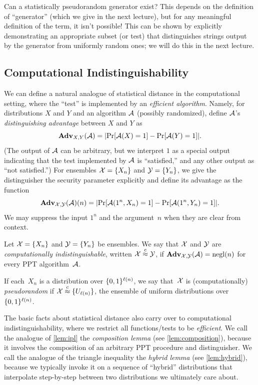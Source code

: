 \documentclass[11pt]{article}
\begin{document}
Can a statistically pseudorandom generator exist?  This
depends on the definition of ``generator'' (which we give in the next lecture), but
for any meaningful definition of the term, it isn't possible!  This
can be shown by explicitly demonstrating an appropriate subset (or
test) that distinguishes strings output by the generator from
uniformly random ones; we will do this in the next lecture.

\subsection{Computational Indistinguishability}
\label{sec:comp-indist}

We can define a natural analogue of statistical distance in the
computational setting, where the ``test'' is implemented by an
\emph{efficient algorithm}.  Namely, for distributions $X$ and $Y$ and
an algorithm $\mathcal{A}$ (possibly randomized), define $\mathcal{A}$'s
\emph{distinguishing advantage} between $X$ and $Y$ as
\[ \advan_{X,Y}(\Adv) = \abs*{\Pr[\Adv(X)=1] - \Pr[\Adv(Y)=1]}. \]
(The output of $\mathcal{A}$ can be arbitrary, but we interpret $1$ as a
special output indicating that the test implemented by $\mathcal{A}$ is
``satisfied,'' and any other output as ``not satisfied.'')
For ensembles $\mathcal{X} = \{X_{n}\}$ and $\mathcal{Y} = \{Y_{n}\}$, we give the distinguisher the security parameter explicitly and define its advantage as the function
\[
  \advan_{\calX,\calY}(\Adv)(n)
  = \abs*{\Pr[\Adv(1^{n},X_{n})=1] - \Pr[\Adv(1^{n},Y_{n})=1]}\text.
\]
We may suppress the input $1^{n}$ and the argument~$n$ when they are clear from context.

\begin{definition}
  \label{def:comp-ind}
  Let $\mathcal{X} = \{X_{n}\}$ and $\mathcal{Y} = \{Y_{n}\}$ be ensembles.
  We say that $\mathcal{X}$ and $\mathcal{Y}$ are \emph{computationally indistinguishable}, written $\mathcal{X} \stackrel{c}{\approx} \mathcal{Y}$, if $\mathbf{Adv}_{\mathcal{X},\mathcal{Y}}(\mathcal{A}) = \operatorname{negl}(n)$ for every PPT algorithm~$\mathcal{A}$.

  \noindent If each~$X_{n}$ is a distribution over $\{0,1\}^{\ell(n)}$, we say that~$\mathcal{X}$ is (computationally) \emph{pseudorandom} if $\mathcal{X} \stackrel{c}{\approx} \{U_{\ell(n)}\}$, the ensemble of uniform distributions over $\{0,1\}^{\ell(n)}$.
\end{definition}

The basic facts about statistical distance also carry over to computational indistinguishability, where we restrict all functions/tests to be \emph{efficient}.
We call the analogue of \cref{lem:ipl} the \emph{composition lemma} (see \cref{lem:composition}), because it involves the composition of an arbitrary PPT procedure and distinguisher.
We call the analogue of the triangle inequality the \emph{hybrid lemma} (see \cref{lem:hybrid}), because we typically invoke it on a sequence of ``hybrid'' distributions that interpolate step-by-step between two distributions we ultimately care about.
\end{document}
